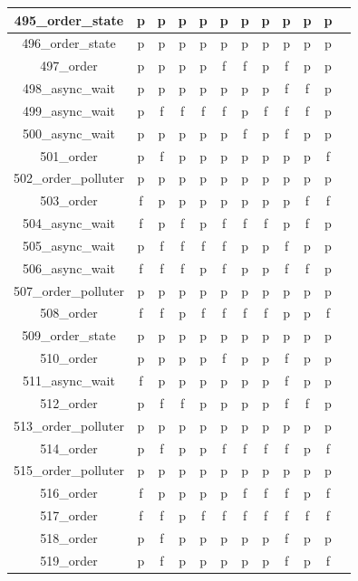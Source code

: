 \documentclass[
fancyheadings, %
%
%
]{stsreprt}
\begin{document}
\begin{longtable}{|c|c|c|c|c|c|c|c|c|c|c|c|}
\hline
495\_order\_state & p & p & p & p & p & p & p & p & p & p \\
\hline
496\_order\_state & p & p & p & p & p & p & p & p & p & p \\
\hline
497\_order & p & p & p & p & f & f & p & f & p & p \\
\hline
498\_async\_wait & p & p & p & p & p & p & p & f & f & p \\
\hline
499\_async\_wait & p & f & f & f & f & p & f & f & f & p \\
\hline
500\_async\_wait & p & p & p & p & p & f & p & f & p & p \\
\hline
501\_order & p & f & p & p & p & p & p & p & p & f \\
\hline
502\_order\_polluter & p & p & p & p & p & p & p & p & p & p \\
\hline
503\_order & f & p & p & p & p & p & p & p & f & f \\
\hline
504\_async\_wait & f & p & f & p & f & f & f & p & f & p \\
\hline
505\_async\_wait & p & f & f & f & f & p & p & f & p & p \\
\hline
506\_async\_wait & f & f & f & p & f & p & p & f & f & p \\
\hline
507\_order\_polluter & p & p & p & p & p & p & p & p & p & p \\
\hline
508\_order & f & f & p & f & f & f & f & p & p & f \\
\hline
509\_order\_state & p & p & p & p & p & p & p & p & p & p \\
\hline
510\_order & p & p & p & p & f & p & p & f & p & p \\
\hline
511\_async\_wait & f & p & p & p & p & p & p & f & p & p \\
\hline
512\_order & p & f & f & p & p & p & p & f & f & p \\
\hline
513\_order\_polluter & p & p & p & p & p & p & p & p & p & p \\
\hline
514\_order & p & f & p & p & f & f & f & f & p & f \\
\hline
515\_order\_polluter & p & p & p & p & p & p & p & p & p & p \\
\hline
516\_order & f & p & p & p & p & f & f & f & p & f \\
\hline
517\_order & f & f & p & f & f & f & f & f & f & f \\
\hline
518\_order & p & f & p & p & p & p & p & f & p & p \\
\hline
519\_order & p & f & p & p & p & p & p & f & p & f \\

\end{longtable}
\end{document}

